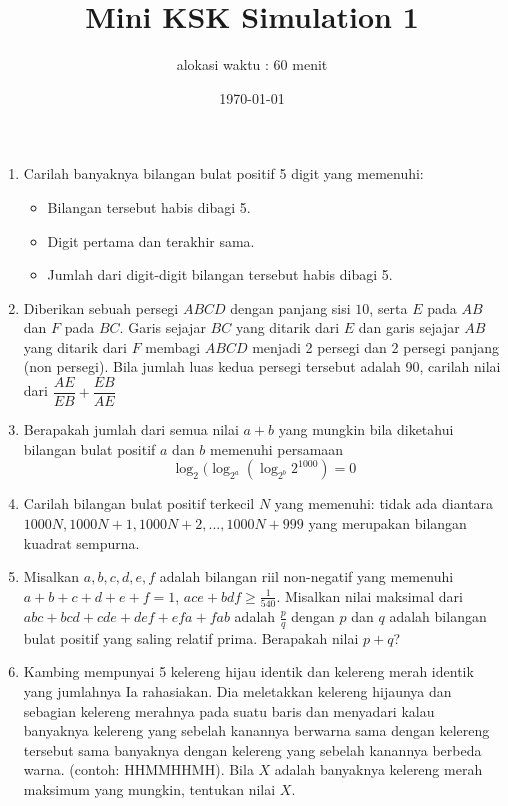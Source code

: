 \documentclass[12pt]{scrartcl}
\title{Mini KSK Simulation 1}
\author{alokasi waktu : 60 menit}
\date{\today}
\begin{document}
	\maketitle

\renewcommand*\contentsname{Daftar Isi}
\tableofcontents

\newpage
	
	\begin{enumerate}
		\item
		Carilah banyaknya bilangan bulat positif 5 digit yang memenuhi:
		\begin{itemize}
			\item
			Bilangan tersebut habis dibagi 5.
			\item
			Digit pertama dan terakhir sama.
			
			\item
			Jumlah dari digit-digit bilangan tersebut habis dibagi 5.
			
			
		\end{itemize}
	\item
	Diberikan sebuah persegi $ABCD$ dengan panjang sisi $10$, serta $E$ pada $AB$ dan $F$ pada $BC$. Garis sejajar $BC$ yang ditarik dari $E$ dan garis sejajar $AB$ yang ditarik dari $F$ membagi $ABCD$ menjadi 2 persegi dan 2 persegi panjang (non persegi). Bila jumlah luas kedua persegi tersebut adalah 90, carilah nilai dari $\dfrac{AE}{EB} + \dfrac{EB}{AE}$
	
	\item
	Berapakah jumlah dari semua nilai $a+b$ yang mungkin bila diketahui bilangan bulat positif $a$ dan $b$ memenuhi persamaan $$\log_2 (\log_{2^a}(\log_{2^b}2^{1000})=0$$
	
	\item
	Carilah bilangan bulat positif terkecil $N$ yang memenuhi: tidak ada diantara $1000N, 1000N+1, 1000N+2, ... , 1000N+999$ yang merupakan bilangan kuadrat sempurna.
	
	\item
	Misalkan $a,b,c,d,e,f$ adalah bilangan riil non-negatif yang memenuhi $a+b+c+d+e+f=1$, $ace+bdf \ge \frac{1}{540}$. Misalkan nilai maksimal dari $abc+bcd+cde+def+efa+fab$ adalah $\frac{p}{q}$ dengan $p$ dan $q$ adalah bilangan bulat positif yang saling relatif prima. Berapakah nilai $p+q$?
	
	\item
	Kambing mempunyai 5 kelereng hijau identik dan kelereng merah identik yang jumlahnya Ia rahasiakan. Dia meletakkan kelereng hijaunya dan sebagian kelereng merahnya pada suatu baris dan menyadari kalau banyaknya kelereng yang sebelah kanannya berwarna sama dengan kelereng tersebut sama banyaknya dengan kelereng yang sebelah kanannya berbeda warna. (contoh: HHMMHHMH). Bila $X$ adalah banyaknya kelereng merah maksimum yang mungkin, tentukan nilai $X$.
	

\end{enumerate}
\end{document}
